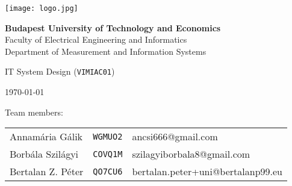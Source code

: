 \begin{titlepage}
	\begin{center}
		\texttt{[image: logo.jpg]}

		\vspace{.2cm}

		\textbf{Budapest University of Technology and Economics} \\
		Faculty of Electrical Engineering and Informatics \\
		Department of Measurement and Information Systems \\

		\vspace{2cm}

		{\huge IT System Design (\texttt{VIMIAC01})}

		\vspace{2cm}

		{\huge \bfseries \thetitle}

		\vspace{.5cm}

		{\Large \theauthor}

		\vspace{.5cm}

		{\Large \today}
	\end{center}

	\vfill{}

	{\large Team members:}

	\vspace{.25cm}

	\begin{tabular}{lll}
		Annamária Gálik &
			\texttt{WGMUO2} &
			ancsi666@gmail.com \\
		Borbála Szilágyi &
			\texttt{COVQ1M} &
			szilagyiborbala8@gmail.com \\
		Bertalan Z. Péter &
			\texttt{QO7CU6} &
			bertalan.peter+uni@bertalanp99.eu
	\end{tabular}

	\vspace{2cm}
\end{titlepage}
